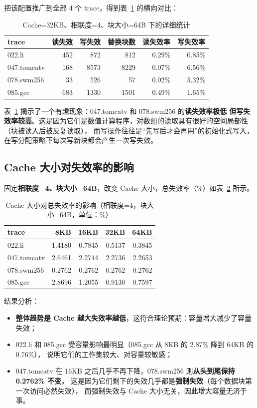 \documentclass[12pt,a4paper]{ctexart}
\begin{document}
把该配置推广到全部 4 个 trace，得到表~\ref{tab:detail} 的横向对比：
\begin{table}[H]
\centering
\caption{Cache=32KB、相联度=4、块大小=64B 下的详细统计}
\label{tab:detail}
\begin{tabular}{lrrrrr}
\toprule
trace & 读失效 & 写失效 & 替换块数 & 读失效率 & 写失效率 \\
\midrule
022.li      & 452 &  872 &  812 & 0.29\% & 0.85\% \\
047.tomcatv & 168 & 8573 & 8229 & 0.07\% & 6.56\% \\
078.swm256  &  33 &  526 &   57 & 0.02\% & 5.32\% \\
085.gcc     & 683 & 1330 & 1501 & 0.49\% & 1.65\% \\
\bottomrule
\end{tabular}
\end{table}
表~\ref{tab:detail} 揭示了一个有趣现象：047.tomcatv 和 078.swm256 的\textbf{读失效率极低
但写失效率较高}。这是因为它们是数值计算程序，对数组的读取具有很好的空间局部性（块被读入后被反复读取），
而写操作往往是“先写后才会再用”的初始化式写入，在写分配策略下每次写新块都会产生一次写失效。

\subsection{Cache 大小对失效率的影响}
固定\textbf{相联度=4、块大小=64B}，改变 Cache 大小，总失效率（\%）如表~\ref{tab:size} 所示。
\begin{table}[H]
\centering
\caption{Cache 大小对总失效率的影响（相联度=4，块大小=64B，单位：\%）}
\label{tab:size}
\begin{tabular}{lrrrr}
\toprule
trace & 8KB & 16KB & 32KB & 64KB \\
\midrule
022.li      & 1.4180 & 0.7845 & 0.5137 & 0.3845 \\
047.tomcatv & 2.6461 & 2.2744 & 2.2736 & 2.2653 \\
078.swm256  & 0.2762 & 0.2762 & 0.2762 & 0.2762 \\
085.gcc     & 2.8696 & 1.2055 & 0.9130 & 0.7597 \\
\bottomrule
\end{tabular}
\end{table}
结果分析：
\begin{itemize}
  \item \textbf{整体趋势是 Cache 越大失效率越低}，这符合理论预期：容量增大减少了容量失效；
  \item 022.li 和 085.gcc 受容量影响最明显（085.gcc 从 8KB 的 2.87\% 降到 64KB 的 0.76\%），
        说明它们的工作集较大、对容量较敏感；
  \item 047.tomcatv 在 16KB 之后几乎不再下降，078.swm256 则\textbf{从头到尾保持 0.2762\% 不变}。
        这是因为它们剩下的失效几乎都是\textbf{强制失效}（每个数据块第一次访问必然失效），
        而强制失效与 Cache 大小无关，因此增大容量无济于事。
\end{itemize}
\end{document}
